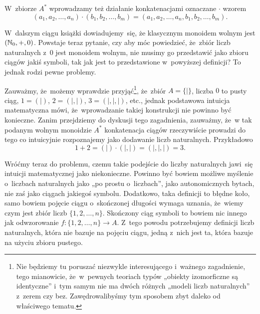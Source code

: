 \documentclass[a4paper,11pt]{article}
\begin{document}
W~zbiorze $A^{ * }$ wprowadzamy też działanie konkatenacjami oznaczane $\cdot$
wzorem
\begin{equation}
  \label{eq:Froys-Forys-03}
  ( a_{ 1 }, a_{ 2 }, \ldots, a_{ n } ) \cdot ( b_{ 1 }, b_{ 2 }, \ldots, b_{ m } ) =
  ( a_{ 1 }, a_{ 2 }, \ldots, a_{ n }, b_{ 1 }, b_{ 2 }, \ldots, b_{ m } ).
\end{equation}

W~dalszym ciągu książki dowiadujemy~się, że klasycznym monoidem wolnym
jest $( \mathbb{N}_{ 0 }, +, 0 )$. Powstaje teraz pytanie, czy aby móc
powiedzieć, że~zbiór liczb naturalnych z~$0$ jest monoidem wolnym, nie
musimy go przedstawić jako zbioru ciągów jakiś symboli, tak jak jest
to przedstawione w~powyższej definicji? To jednak rodzi pewne
problemy.

Zauważmy, że~możemy wprawdzie przyjąć\footnote{Nie będziemy tu
  poruszać niezwykle interesującego i~ważnego zagadnienie, tego
  mianowicie, że~w~pewnych teoriach typów „obiekty izomorficzne są
  identyczne” i~tym samym nie ma dwóch różnych „modeli liczb
  naturalnych” z~zerem czy bez. Zawędrowalibyśmy tym sposobem zbyt
  daleko od właściwego tematu.}, że~zbiór $A = \{ | \}$, liczba $0$ to
pusty ciąg, $1 = ( | )$, $2 = ( |, | )$, $3 = ( |, |, | )$, etc.,
jednak podstawowa intuicja matematyczna mówi, że~wprowadzanie takiej
konstrukcji nie powinno być konieczne. Zanim przejdziemy do dyskusji
tego zagadnienia, zauważmy, że~w tak podanym wolnym monoidzie
$A^{ * }$ konkatenacja ciągów rzeczywiście prowadzi do tego co
intuicyjnie rozpoznajemy jako dodawanie liczb naturalnych. Przykładowo
\begin{equation}
  \label{eq:Forys-Forys-04}
  1 + 2 = ( | ) \cdot ( |, | ) = ( |, |, | ) = 3.
\end{equation}

Wróćmy teraz do problemu, czemu takie podejście do liczby naturalnych
jawi~się intuicji matematycznej jako niekonieczne. Powinno być bowiem
możliwe myślenie o~liczbach naturalnych jako „po prostu o~liczbach”,
jako autonomicznych bytach, nie zaś jako ciągach jakiegoś symbolu.
Dodatkowo, taka definicji to błędne koło, samo bowiem pojęcie ciągu
o~skończonej długości wymaga uznania, że~wiemy czym jest zbiór liczb
$\{ 1, 2, \ldots, n \}$. Skończony ciąg symboli to bowiem nic innego jak
odwzorowanie $f : \{ 1, 2, \ldots, n \} \to A$. Z~tego powodu potrzebujemy
definicji liczb naturalnych, która nie bazuje na pojęciu ciągu, jedną
z~nich jest ta, która bazuje na użyciu zbioru pustego.
\end{document}
